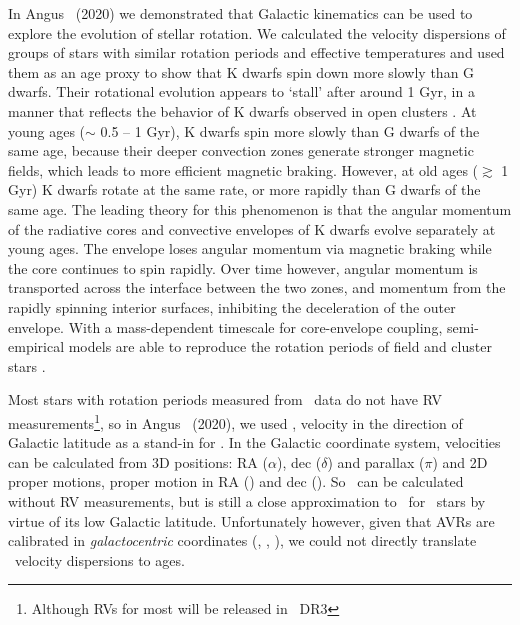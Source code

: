 In Angus \etal\ (2020) we demonstrated that Galactic kinematics can be used to
explore the evolution of stellar rotation.
We calculated the velocity dispersions of groups of stars with similar
rotation periods and effective temperatures and used them as an age proxy to
show that K dwarfs spin down more slowly than G dwarfs.
Their rotational evolution appears to `stall' after around 1 Gyr, in a manner
that reflects the behavior of K dwarfs observed in open clusters
\citep{curtis2019}.
At young ages ($\sim$ 0.5 -- 1 Gyr), K dwarfs spin more slowly than G dwarfs of
the same age, because their deeper convection zones generate stronger magnetic
fields, which leads to more efficient magnetic braking.
However, at old ages ($\gtrsim$ 1 Gyr) K dwarfs rotate at the same rate, or
more rapidly than G dwarfs of the same age.
The leading theory for this phenomenon is that the angular momentum of the
radiative cores and convective envelopes of K dwarfs evolve separately at
young ages.
The envelope loses angular momentum via magnetic braking while the core
continues to spin rapidly.
Over time however, angular momentum is transported across the interface
between the two zones, and momentum from the rapidly spinning interior
surfaces, inhibiting the deceleration of the outer envelope.
With a mass-dependent timescale for core-envelope coupling, semi-empirical
models are able to reproduce the rotation periods of field and cluster stars
\citep[][Angus \etal, 2020]{spada2019, curtis2019}.

Most stars with rotation periods measured from \kepler\ data do not have RV
measurements\footnote{Although RVs for most will be released in \gaia\ DR3},
so in Angus \etal\ (2020), we used \vb, velocity in the direction of Galactic
latitude as a stand-in for \vz.
In the Galactic coordinate system, velocities can be calculated from 3D
positions: RA ($\alpha$), dec ($\delta$) and parallax ($\pi$) and 2D proper
motions, proper motion in RA (\mura) and dec (\mudec).
So \vb\ can be calculated without RV measurements, but is still a close
approximation to \vz\ for \kepler\ stars by virtue of its low Galactic
latitude.
Unfortunately however, given that AVRs are calibrated in {\it galactocentric}
coordinates (\vx, \vy, \vz), we could not directly translate \vb\ velocity
dispersions to ages.

